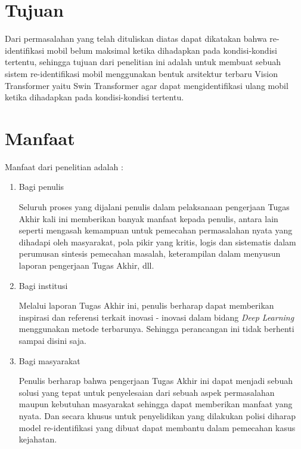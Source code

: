 \section{Tujuan}
\label{sec:Tujuan}

Dari permasalahan yang telah dituliskan diatas dapat dikatakan bahwa re-identifikasi mobil belum maksimal
ketika dihadapkan pada kondisi-kondisi tertentu, sehingga tujuan dari penelitian ini adalah untuk membuat
sebuah sistem re-identifikasi mobil menggunakan bentuk arsitektur terbaru Vision Transformer yaitu 
Swin Transformer agar dapat mengidentifikasi ulang mobil ketika dihadapkan pada kondisi-kondisi tertentu.

\section{Manfaat}
\label{sec:manfaat}

Manfaat dari penelitian adalah :

\begin{enumerate}[nolistsep]
  
  \item Bagi penulis
  
  Seluruh proses yang dijalani penulis dalam pelaksanaan pengerjaan Tugas Akhir
  kali ini memberikan banyak manfaat kepada penulis, antara lain seperti mengasah
  kemampuan untuk pemecahan permasalahan nyata yang dihadapi oleh masyarakat,
  pola pikir yang kritis, logis dan sistematis dalam perumusan sintesis pemecahan
  masalah, keterampilan dalam menyusun laporan pengerjaan Tugas Akhir, dll.
  \item Bagi institusi
  
  Melalui laporan Tugas Akhir ini, penulis berharap dapat memberikan inspirasi dan
  referensi terkait inovasi - inovasi dalam bidang \emph{Deep Learning} menggunakan 
  metode terbarunya. Sehingga perancangan ini tidak berhenti sampai disini saja.
  \item Bagi masyarakat
  
  Penulis berharap bahwa pengerjaan Tugas Akhir ini dapat menjadi sebuah solusi yang 
  tepat untuk penyelesaian dari sebuah aspek permasalahan
  maupun kebutuhan masyarakat sehingga dapat memberikan manfaat yang nyata.
  Dan secara khusus untuk penyelidikan yang dilakukan polisi diharap model re-identifikasi yang dibuat
  dapat membantu dalam pemecahan kasus kejahatan.
  
\end{enumerate}


